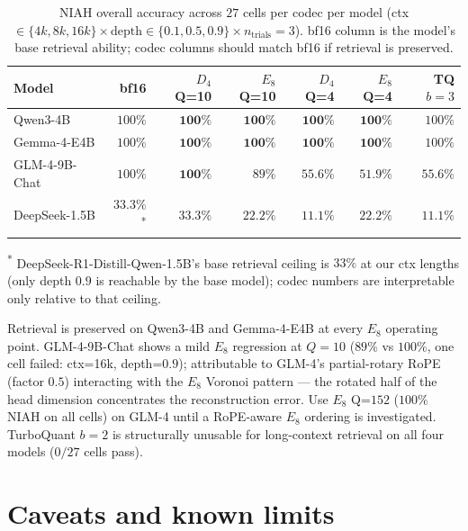 \documentclass[10pt,a4paper]{article}
\theoremstyle{definition}
\theoremstyle{plain}
\begin{document}
\begin{table}[H]
\centering
\small
\caption{NIAH overall accuracy across $27$ cells per codec per
model (ctx $\in\{4k,8k,16k\} \times \text{depth} \in \{0.1,0.5,0.9\}
\times n_\mathrm{trials} = 3$). bf16 column is the model's base
retrieval ability; codec columns should match bf16 if retrieval is
preserved.}
\label{tab:v15-niah}
\begin{tabular}{lrrrrrr}
  \toprule
  Model & bf16 & $D_4$ Q=10 & $E_8$ Q=10 & $D_4$ Q=4 & $E_8$ Q=4 & TQ $b=3$ \\
  \midrule
  Qwen3-4B      & $100\%$ & $\mathbf{100\%}$ & $\mathbf{100\%}$ & $\mathbf{100\%}$ & $\mathbf{100\%}$ & $100\%$ \\
  Gemma-4-E4B   & $100\%$ & $\mathbf{100\%}$ & $\mathbf{100\%}$ & $\mathbf{100\%}$ & $\mathbf{100\%}$ & $100\%$ \\
  GLM-4-9B-Chat & $100\%$ & $\mathbf{100\%}$ & $89\%$ & $55.6\%$ & $51.9\%$ & $55.6\%$ \\
  DeepSeek-1.5B & $33.3\%$\textsuperscript{*} & $33.3\%$ & $22.2\%$ & $11.1\%$ & $22.2\%$ & $11.1\%$ \\
  \bottomrule
\end{tabular}
\end{table}

\textsuperscript{*} DeepSeek-R1-Distill-Qwen-1.5B's base retrieval
ceiling is $33\%$ at our ctx lengths (only depth $0.9$ is reachable
by the base model); codec numbers are interpretable only relative
to that ceiling.

Retrieval is preserved on Qwen3-4B and Gemma-4-E4B at every
$E_8$ operating point. GLM-4-9B-Chat shows a mild $E_8$ regression
at $Q=10$ ($89\%$ vs $100\%$, one cell failed: ctx=16k,
depth=$0.9$); attributable to GLM-4's partial-rotary RoPE (factor
$0.5$) interacting with the $E_8$ Voronoi pattern --- the rotated
half of the head dimension concentrates the reconstruction error.
Use $E_8$ Q=$152$ ($100\%$ NIAH on all cells) on GLM-4 until a
RoPE-aware $E_8$ ordering is investigated. TurboQuant $b=2$ is
structurally unusable for long-context retrieval on all four
models ($0/27$ cells pass).

\section{Caveats and known limits}
\label{sec:limits}
\end{document}
